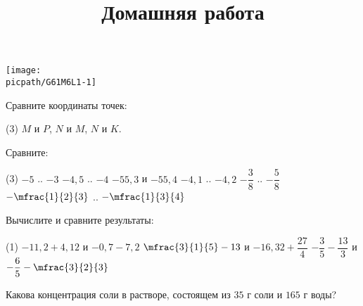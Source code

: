 \begin{consultation}
\begin{listofex}
	\end{listofex}
	\newpage
	\title{Домашняя работа}
	\begin{listofex}
		\item
		\begin{minipage}[c]{0.45\textwidth}
			\texttt{[image: \\picpath/G61M6L1-1]}
		\end{minipage}
		\begin{minipage}[c]{0.45\textwidth}
			Сравните координаты точек: 
			\begin{tasks}(3)
				\task \( M \) и \( P \),
				\task \( N \) и \( M \),
				\task \( N \) и \( K \).
			\end{tasks}
		\end{minipage}
		\item Сравните:
		\begin{tasks}(3)
			\task \( -5 \) .. \( -3 \)
			\task \( -4,5 \) .. \( -4 \)
			\task \( -55,3 \) и \( -55,4 \)
			\task \( -4,1 \) .. \( -4,2 \)
			\task \( -\dfrac{3}{8} \) .. \( -\dfrac{5}{8} \)
			\task \( -\mfrac{1}{2}{3} \) .. \( -\mfrac{1}{3}{4} \)
		\end{tasks}
		\item Вычислите и сравните результаты:
		\begin{tasks}(1)
			\task \( -11,2+4,12 \)  и  \( -0,7-7,2 \)
			\task \( \mfrac{3}{1}{5}-13 \) и \( -16,32 +\dfrac{27}{4} \)
			\task \( -\dfrac{3}{5}-\dfrac{13}{3} \) и \( -\dfrac{6}{5}-\mfrac{3}{2}{3} \)
		\end{tasks}
	\item Какова концентрация соли в растворе, состоящем из \(35\) г соли и \(165\) г воды?
	\end{listofex}
	\end{consultation}
